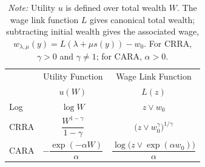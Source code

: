 \begin{table}[ht]
    \centering
    \caption{Utility Functions and Wage Link Functions}
    \label{tab:utility_functions}
    \renewcommand{\arraystretch}{1.5}
    \setlength{\tabcolsep}{10pt}
    \begin{tabular*}{\textwidth}{@{\extracolsep{\fill}}lcc}
        \toprule
        & \multicolumn{1}{c}{Utility Function}
        & \multicolumn{1}{c}{Wage Link Function} \\
        & \(u(W)\) & \(L(z)\) \\
        \midrule
        Log
        & \(\log W\)
        & \(z\vee w_0\) \\
        CRRA
        & \(\dfrac{W^{1-\gamma}}{1-\gamma}\)
        & \(\bigl(z\vee w_0^\gamma\bigr)^{1/\gamma}\) \\
        CARA
        & \(-\dfrac{\exp(-\alpha W)}{\alpha}\)
        & \(\dfrac{\log\bigl(z\vee\exp(\alpha w_0)\bigr)}{\alpha}\) \\
        \bottomrule
    \end{tabular*}
    \captionsetup{font=footnotesize}
    \caption*{\textit{Note:} Utility $u$ is defined over total wealth $W$.  The
    wage link function $L$ gives canonical total wealth; subtracting initial wealth gives
    the associated wage,
    $w_{\lambda,\mu}(y)=L(\lambda+\mu s(y))-w_0$.  For CRRA,
    $\gamma>0$ and $\gamma\neq1$; for CARA, $\alpha>0$.}
\end{table}

